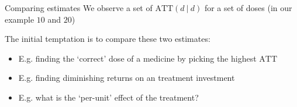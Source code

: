 \documentclass[aspectratio=43,t]{beamer}
\begin{document}
\begin{frame}{Comparing estimates}
  We observe a set of $\text{ATT}(d \ | \ d)$ for a set of doses (in our example $10$ and $20$)

  \bigskip
  The initial temptation is to compare these two estimates:
  \begin{itemize}
    \item E.g. finding the `correct' dose of a medicine by picking the highest $\text{ATT}$

    \item E.g. finding diminishing returns on an treatment investment

    \item E.g. what is the `per-unit' effect of the treatment?
  \end{itemize}
\end{frame}
%
%
%
%
\end{document}
